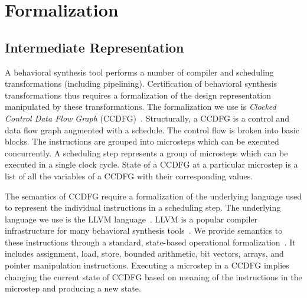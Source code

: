 \section{Formalization}
\label{sec:formalization}

\subsection{Intermediate Representation}
\label{subsec:ir}

A behavioral synthesis tool performs a number of compiler
and scheduling transformations (including pipelining). Certification of behavioral synthesis transformations thus requires a formalization of
the design representation manipulated by these
transformations. The formalization we use is {\em Clocked
  Control Data Flow Graph} (CCDFG)~\cite{rhcxy:atva-09}. 
Structurally, a CCDFG is a control and data flow graph augmented with a schedule. The control flow is broken into basic blocks. The instructions are grouped into microsteps which can be executed concurrently. A scheduling step represents a group of microsteps which can be executed in a single clock cycle. State of a CCDFG at a particular microstep is a list of all the variables of a CCDFG with their corresponding values. 

The semantics of CCDFG require a formalization of the
underlying language used to represent the individual
instructions in a scheduling step.  The underlying language we use
is the LLVM language~\cite{llvm}. LLVM is a popular compiler
infrastructure for many behavioral synthesis tools~\cite{autoesl,xpilot}.
We provide semantics to these
instructions through a standard, state-based operational
formalization~\cite{McCarthy}. It includes assignment,
load, store, bounded arithmetic, bit vectors, arrays, and
pointer manipulation instructions. Executing a microstep in
a CCDFG implies changing the current state of CCDFG based on
meaning of the instructions in the microstep and producing a
new state. %

